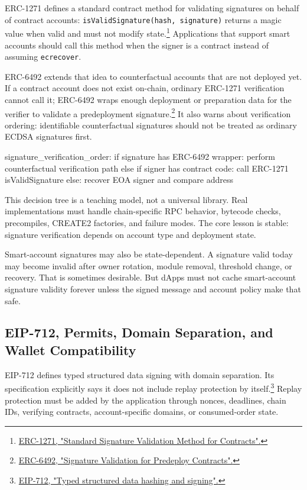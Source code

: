 ERC-1271 defines a standard contract method for validating signatures on behalf of contract accounts: \texttt{isValidSignature(hash, signature)} returns a magic value when valid and must not modify state.\footnote{\href{https://eips.ethereum.org/EIPS/eip-1271}{ERC-1271, "Standard Signature Validation Method for Contracts".}} Applications that support smart accounts should call this method when the signer is a contract instead of assuming \texttt{ecrecover}.

ERC-6492 extends that idea to counterfactual accounts that are not deployed yet. If a contract account does not exist on-chain, ordinary ERC-1271 verification cannot call it; ERC-6492 wraps enough deployment or preparation data for the verifier to validate a predeployment signature.\footnote{\href{https://eips.ethereum.org/EIPS/eip-6492}{ERC-6492, "Signature Validation for Predeploy Contracts".}} It also warns about verification ordering: identifiable counterfactual signatures should not be treated as ordinary ECDSA signatures first.

\begin{codeblock}
signature_verification_order:
    if signature has ERC-6492 wrapper:
        perform counterfactual verification path
    else if signer has contract code:
        call ERC-1271 isValidSignature
    else:
        recover EOA signer and compare address
\end{codeblock}

This decision tree is a teaching model, not a universal library. Real implementations must handle chain-specific RPC behavior, bytecode checks, precompiles, CREATE2 factories, and failure modes. The core lesson is stable: signature verification depends on account type and deployment state.

Smart-account signatures may also be state-dependent. A signature valid today may become invalid after owner rotation, module removal, threshold change, or recovery. That is sometimes desirable. But dApps must not cache smart-account signature validity forever unless the signed message and account policy make that safe.

\subsection{EIP-712, Permits, Domain Separation, and Wallet Compatibility}

EIP-712 defines typed structured data signing with domain separation. Its specification explicitly says it does not include replay protection by itself.\footnote{\href{https://eips.ethereum.org/EIPS/eip-712}{EIP-712, "Typed structured data hashing and signing".}} Replay protection must be added by the application through nonces, deadlines, chain IDs, verifying contracts, account-specific domains, or consumed-order state.

